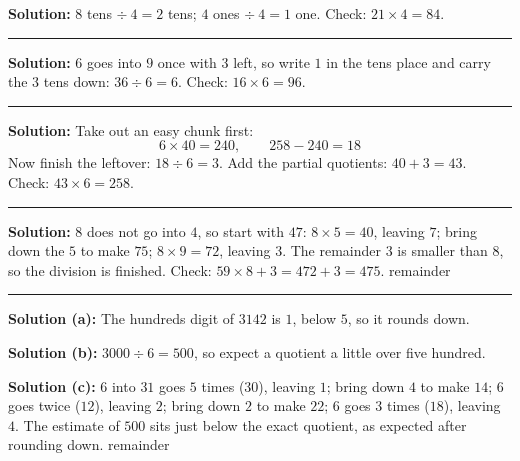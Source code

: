 \documentclass[12pt]{article}
\begin{document}



\textbf{Solution:} $8$ tens $\div\ 4 = 2$ tens; $4$ ones $\div\ 4 = 1$ one. Check:
$21 \times 4 = 84$. 

\vspace{0.12cm}\noindent\rule{\linewidth}{0.2pt}


\textbf{Solution:} $6$ goes into $9$ once with $3$ left, so write $1$ in the tens place and carry the
$3$ tens down: $36 \div 6 = 6$. Check: $16 \times 6 = 96$. 

\vspace{0.12cm}\noindent\rule{\linewidth}{0.2pt}


\textbf{Solution:} Take out an easy chunk first:
\[ 6 \times 40 = \boxed{240}, \qquad 258 - 240 = \boxed{18} \]
Now finish the leftover: $18 \div 6 = \boxed{3}$. Add the partial quotients: $40 + 3 = 43$. Check:
$43 \times 6 = 258$. 

\vspace{0.12cm}\noindent\rule{\linewidth}{0.2pt}


\textbf{Solution:} $8$ does not go into $4$, so start with $47$: $8 \times 5 = 40$, leaving $7$; bring
down the $5$ to make $75$; $8 \times 9 = 72$, leaving $3$. The remainder $3$ is smaller than $8$, so
the division is finished. Check: $59 \times 8 + 3 = 472 + 3 = 475$.  \quad remainder 

\vspace{0.12cm}\noindent\rule{\linewidth}{0.2pt}


\textbf{Solution (a):} The hundreds digit of $3142$ is $1$, below $5$, so it rounds down. 

\textbf{Solution (b):} $3000 \div 6 = 500$, so expect a quotient a little over five hundred. 

\textbf{Solution (c):} $6$ into $31$ goes $5$ times ($30$), leaving $1$; bring down $4$ to make $14$;
$6$ goes twice ($12$), leaving $2$; bring down $2$ to make $22$; $6$ goes $3$ times ($18$), leaving
$4$. The estimate of $500$ sits just below the exact quotient, as expected after rounding down.
 \quad remainder 
\end{document}
